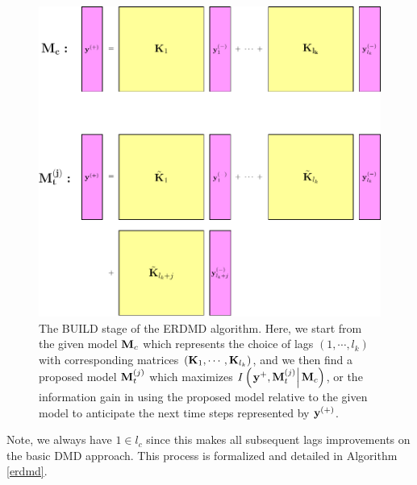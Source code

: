 \documentclass[a4paper,11pt]{article}
\begin{document}
\begin{figure}
\centering
\includegraphics[scale=.75]{square_games-pics}
\caption{The BUILD stage of the ERDMD algorithm.  Here, we start from the given model ${\bf M}_{c}$ which represents the choice of lags $(1, \cdots, l_{k})$ with corresponding matrices $({\bf K}_{1}, \cdots, {\bf K}_{l_{k}})$, and we then find a proposed model ${\bf M}^{(j)}_{t}$ which maximizes $I\left(\left.{\bf y}^{+}, {\bf M}^{(j)}_{t}\right|{\bf M}_{c}\right)$, or the information gain in using the proposed model relative to the given model to anticipate the next time steps represented by ${\bf y}^{(+)}$.}  
\label{fig:build_stage}
\end{figure}
Note, we always have $1\in l_{c}$ since this makes all subsequent lags improvements on the basic DMD approach.  This process is formalized and detailed in Algorithm \ref{erdmd}.  
\end{document}

